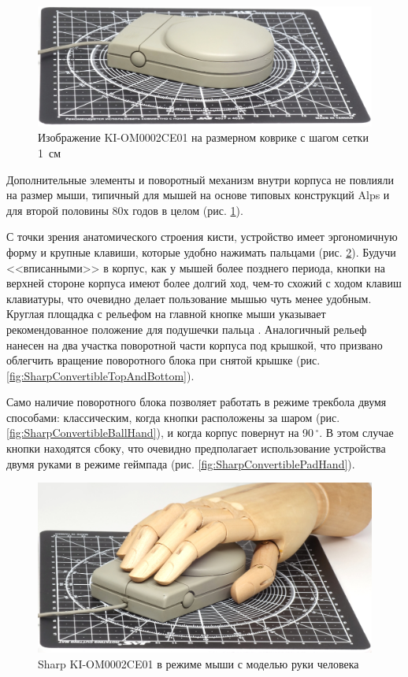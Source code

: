 \documentclass[11pt, a4paper]{article}
\begin{document}
\begin{figure}[h]
    \centering
    \includegraphics[scale=0.5]{1987_sharp_convertible/size_30.jpg}
    \caption{Изображение KI-OM0002CE01 на размерном коврике с шагом сетки 1~см}
    \label{fig:SharpConvertibleSize}
\end{figure}

Дополнительные элементы и поворотный механизм внутри корпуса не повлияли на размер мыши, типичный для мышей на основе типовых конструкций Alps и для второй половины 80х годов в целом (рис. \ref{fig:SharpConvertibleSize}).

С точки зрения анатомического строения кисти, устройство имеет эргономичную  форму и крупные клавиши, которые удобно нажимать пальцами (рис. \ref{fig:SharpConvertibleHand}). Будучи <<вписанными>> в корпус, как у мышей более позднего периода, кнопки на верхней стороне корпуса имеют более долгий ход, чем-то схожий с ходом клавиш клавиатуры, что очевидно делает пользование мышью чуть менее удобным. Круглая площадка с рельефом на главной кнопке мыши указывает рекомендованное положение для подушечки пальца \cite{JapaneseClickSense}. Аналогичный рельеф нанесен на два участка поворотной части корпуса под крышкой, что призвано облегчить вращение поворотного блока при снятой крышке (рис. \ref{fig:SharpConvertibleTopAndBottom}).

Само наличие поворотного блока позволяет работать в режиме трекбола двумя способами: классическим, когда кнопки расположены за шаром (рис. \ref{fig:SharpConvertibleBallHand}), и когда корпус повернут на 90\,$^\circ$. В этом случае кнопки находятся сбоку, что очевидно предполагает использование устройства двумя руками в режиме геймпада (рис. \ref{fig:SharpConvertiblePadHand}).

\begin{figure}[h]
    \centering
    \includegraphics[scale=0.44]{1987_sharp_convertible/handmouse_15.jpg}
    \caption{Sharp KI-OM0002CE01 в режиме мыши с моделью руки человека}
    \label{fig:SharpConvertibleHand}
\end{figure}
\end{document}
